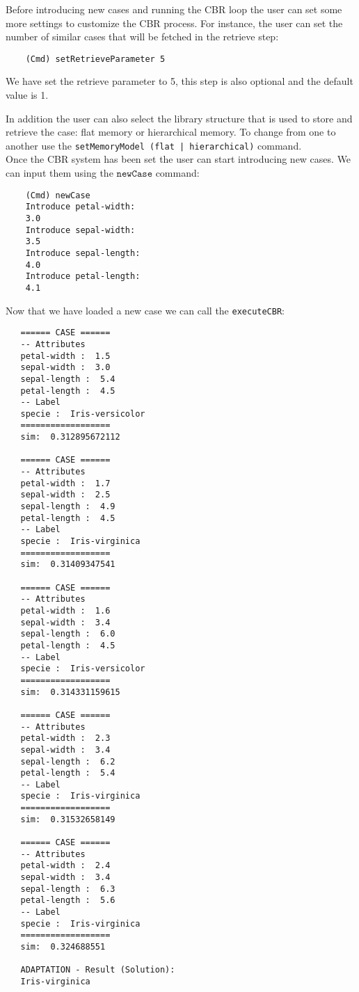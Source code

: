 \documentclass[11pt]{article}
\begin{document}
Before introducing new cases and running the CBR loop the user can set some more settings to customize the CBR process. For instance, the user can set the number of similar cases that will be fetched in the retrieve step:
\begin{verbatim}
    (Cmd) setRetrieveParameter 5
\end{verbatim}
We have set the retrieve parameter to 5, this step is also optional and the default value is 1.

In addition the user can also select the library structure that is used to store and retrieve the case: flat memory or hierarchical memory. To change from one to another use the \texttt{setMemoryModel (flat | hierarchical)} command.
\\

Once the CBR system has been set the user can start introducing new cases. We can input them using the $\texttt{newCase}$ command:
\begin{verbatim}
    (Cmd) newCase
    Introduce petal-width:
    3.0
    Introduce sepal-width:
    3.5
    Introduce sepal-length:
    4.0
    Introduce petal-length:
    4.1
\end{verbatim}

Now that we have loaded a new case we can call the \texttt{executeCBR}:
\begin{verbatim}
   ====== CASE ======
   -- Attributes
   petal-width :  1.5
   sepal-width :  3.0
   sepal-length :  5.4
   petal-length :  4.5
   -- Label
   specie :  Iris-versicolor
   ==================
   sim:  0.312895672112

   ====== CASE ======
   -- Attributes
   petal-width :  1.7
   sepal-width :  2.5
   sepal-length :  4.9
   petal-length :  4.5
   -- Label
   specie :  Iris-virginica
   ==================
   sim:  0.31409347541
   
   ====== CASE ======
   -- Attributes
   petal-width :  1.6
   sepal-width :  3.4
   sepal-length :  6.0
   petal-length :  4.5
   -- Label
   specie :  Iris-versicolor
   ==================
   sim:  0.314331159615
   
   ====== CASE ======
   -- Attributes
   petal-width :  2.3
   sepal-width :  3.4
   sepal-length :  6.2
   petal-length :  5.4
   -- Label
   specie :  Iris-virginica
   ==================
   sim:  0.31532658149
   
   ====== CASE ======
   -- Attributes
   petal-width :  2.4
   sepal-width :  3.4
   sepal-length :  6.3
   petal-length :  5.6
   -- Label
   specie :  Iris-virginica
   ==================
   sim:  0.324688551
   
   ADAPTATION - Result (Solution):
   Iris-virginica
\end{verbatim}
\end{document}
